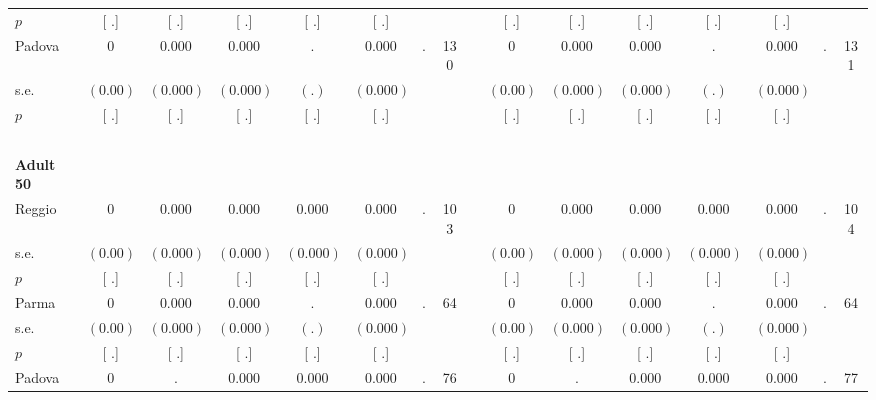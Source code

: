 \begin{longtable}{L{8em} c c c c c c c p{1em} c c c c c c c}
\quad \quad \quad \quad $ p$ & [        .] & [        .] & [        .] & [        .] & [        .] & & & & [        .] & [        .] & [        .] & [        .] & [        .] & &  \\[1em]
\quad \quad \quad Padova& 0 &     0.000 &     0.000 &         . &     0.000 &         . &       130 & & 0 &     0.000 &     0.000 &         . &     0.000 &         . &       131  \\*
\quad \quad \quad \quad s.e.& $ (     0.00)$ & $ (    0.000)$ & $ (    0.000)$ & $ (        .)$ & $ (    0.000)$ & & & & $ (     0.00)$ & $ (    0.000)$ & $ (    0.000)$ & $ (        .)$ & $ (    0.000)$ & &  \\*
\quad \quad \quad \quad $ p$ & [        .] & [        .] & [        .] & [        .] & [        .] & & & & [        .] & [        .] & [        .] & [        .] & [        .] & &  \\[1em]
~\\[1em]
\quad \quad \textbf{Adult 50} & & & & & & & & & & & & & & & \\* 
\quad \quad \quad Reggio& 0 &     0.000 &     0.000 &     0.000 &     0.000 &         . &       103 & & 0 &     0.000 &     0.000 &     0.000 &     0.000 &         . &       104  \\*
\quad \quad \quad \quad s.e.& $ (     0.00)$ & $ (    0.000)$ & $ (    0.000)$ & $ (    0.000)$ & $ (    0.000)$ & & & & $ (     0.00)$ & $ (    0.000)$ & $ (    0.000)$ & $ (    0.000)$ & $ (    0.000)$ & &  \\*
\quad \quad \quad \quad $ p$ & [        .] & [        .] & [        .] & [        .] & [        .] & & & & [        .] & [        .] & [        .] & [        .] & [        .] & &  \\[1em]
\quad \quad \quad Parma& 0 &     0.000 &     0.000 &         . &     0.000 &         . &        64 & & 0 &     0.000 &     0.000 &         . &     0.000 &         . &        64  \\*
\quad \quad \quad \quad s.e.& $ (     0.00)$ & $ (    0.000)$ & $ (    0.000)$ & $ (        .)$ & $ (    0.000)$ & & & & $ (     0.00)$ & $ (    0.000)$ & $ (    0.000)$ & $ (        .)$ & $ (    0.000)$ & &  \\*
\quad \quad \quad \quad $ p$ & [        .] & [        .] & [        .] & [        .] & [        .] & & & & [        .] & [        .] & [        .] & [        .] & [        .] & &  \\[1em]
\quad \quad \quad Padova& 0 &         . &     0.000 &     0.000 &     0.000 &         . &        76 & & 0 &         . &     0.000 &     0.000 &     0.000 &         . &        77  \\*

\end{longtable}
